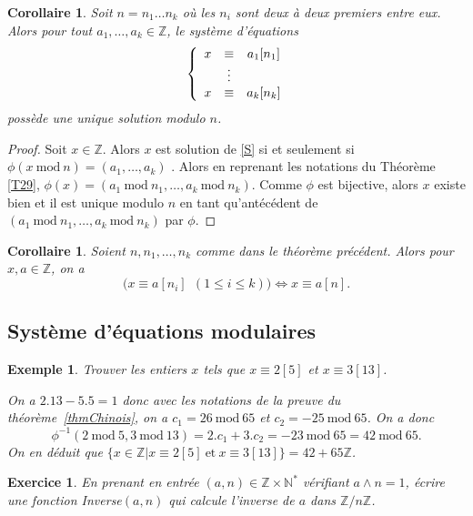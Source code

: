 \documentclass[12pt]{report}
\newtheorem*{ex}{Exemple}
\newtheorem*{exo}{Exercice}
\newtheorem{Cor}[thm]{Corollaire}
\newcommand{\Z}{\mathbb{Z}}
\begin{document}
\begin{Cor}
Soit $n=n_1 \ldots n_k$ où les $n_i$ sont deux à deux premiers entre eux. Alors pour tout $a_1, \ldots, a_k \in \mathbb{Z}$, le système d'équations 
\begin{equation}{\color{red}\label{S}}
\left \{ \begin{array}{ccc}
x & \equiv & a_1 [n_1] \\
  &      \vdots    &   \\
x & \equiv & a_k [n_k]   
\end{array}   \right.
\end{equation}
possède une unique solution modulo $n$.
\end{Cor}

\begin{proof}
Soit $x\in \Z$. Alors $x$ est solution de  \eqref{S} si et seulement si $\phi(x\mathrm{\ mod\ }n)=(a_1,\ldots, a_k)$ . Alors en reprenant les notations du Théorème \ref{T29}, $\phi(x)=(a_1\mathrm{\ mod \ }n_1, \ldots, a_k\mathrm{\ mod\ }n_k)$. Comme $\phi$ est bijective, alors $x$ existe bien et il est unique modulo $n$ en tant qu'antécédent de $(a_1\mathrm{\ mod \ }n_1, \ldots, a_k\mathrm{\ mod\ }n_k)$ par $\phi$. 
\end{proof}

\begin{Cor}
Soient $n, n_1, \ldots, n_k$ comme dans le théorème précédent. Alors pour $x,a\in \Z$, on a 
$$ \big( x \equiv a [n_i] \ \ (1 \leq  i \leq k)    \big) \Longleftrightarrow x \equiv a [n]  .     $$
\end{Cor}



\subsection*{Système d'équations modulaires}

\begin{ex}
Trouver les entiers $x$ tels que $x\equiv 2 [5]$ et $x \equiv 3 [13]  $.\par 

On a $2.13-5.5=1$ donc avec les notations de la preuve du théorème~\ref{thmChinois}, on a $c_1=26\mathrm{\ mod \ }65$ et $c_2=-25\mathrm{\ mod\ }65$. On a donc \[\phi^{-1}(2\mathrm{\ mod\ }5,3\mathrm{\ mod\ }13)=2.c_1+3.c_2=-23\mathrm{\ mod\ }65=42\mathrm{\ mod\ }65.\] On en déduit que $\{x\in \Z| x\equiv 2[5]\mathrm{\ et\ }x\equiv 3[13]\}=42+65\Z$.
\end{ex}

\begin{exo}
En prenant en entrée $(a,n)\in \mathbb{Z}\times \mathbb{N}^*$ vérifiant $a \wedge n=1$, écrire une fonction Inverse$(a,n)$ qui calcule l'inverse de $a$ dans $\mathbb{Z}/n \mathbb{Z}$.
\end{exo}
\end{document}
